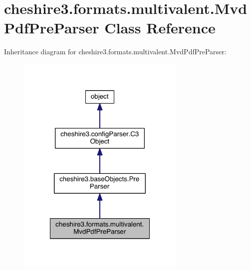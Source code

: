 \hypertarget{classcheshire3_1_1formats_1_1multivalent_1_1_mvd_pdf_pre_parser}{\section{cheshire3.\-formats.\-multivalent.\-Mvd\-Pdf\-Pre\-Parser Class Reference}
\label{classcheshire3_1_1formats_1_1multivalent_1_1_mvd_pdf_pre_parser}
}


Inheritance diagram for cheshire3.\-formats.\-multivalent.\-Mvd\-Pdf\-Pre\-Parser\-:
\nopagebreak
\begin{figure}[H]
\begin{center}
\leavevmode
\includegraphics[width=228pt]{classcheshire3_1_1formats_1_1multivalent_1_1_mvd_pdf_pre_parser__inherit__graph}
\end{center}
\end{figure}


